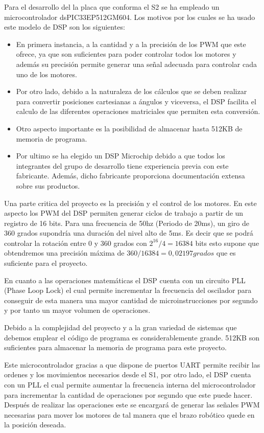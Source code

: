 Para el desarrollo del la placa que conforma el S2 se ha empleado un microcontrolador dsPIC33EP512GM604.
Los motivos por los cuales se ha usado este modelo de DSP son los siguientes: 

\begin{itemize}
\item En primera instancia, a la cantidad y a la precisión de los PWM que este ofrece, ya que son suficientes para poder controlar todos los motores y además su precisión permite generar una señal adecuada para controlar cada uno de los motores.

\item Por otro lado, debido a la naturaleza de los cálculos que se deben realizar para convertir posiciones cartesianas a ángulos y viceversa, el DSP facilita el calculo de las diferentes operaciones matriciales que permiten esta conversión.

\item Otro aspecto importante es la posibilidad de almacenar hasta 512KB de memoria de programa.

\item Por ultimo se ha elegido un DSP Microchip debido a que todos los integrantes del grupo de desarrollo tiene experiencia previa con este fabricante. Además, dicho fabricante proporciona documentación extensa sobre sus productos.

\end{itemize}

Una parte critica del proyecto es la precisión y el control de los motores. En este aspecto los PWM del DSP permiten generar ciclos de trabajo a partir de un registro de 16 bits. Para una frecuencia de 50hz (Periodo de 20ms), un giro de 360 grados supondría una duración del nivel alto de 5ms. Es decir que se podrá controlar la rotación entre 0 y 360 grados con $ 2^{16}/4 = 16384$ bits esto supone que obtendremos una precisión máxima de $360/16384 = 0,02197 grados$ que es suficiente para el proyecto.

En cuanto a las operaciones matemáticas el DSP cuenta con un circuito PLL (Phase Loop Lock) el cual permite incrementar la frecuencia del oscilador para conseguir de esta manera una mayor cantidad de microinstrucciones por segundo y por tanto un mayor volumen de operaciones.

Debido a la complejidad del proyecto y a la gran variedad de sistemas que debemos emplear el código de programa es considerablemente grande. 512KB son suficientes para almacenar la memoria de programa para este proyecto.

Este microcontrolador gracias a que dispone de puertos UART permite recibir las ordenes y los movimientos necesarios desde el S1, por otro lado, el DSP cuenta con un PLL el cual permite aumentar la frecuencia interna del microcontrolador para incrementar la cantidad de operaciones por segundo que este puede hacer. Después de realizar las operaciones este se encargará de generar las señales PWM necesarias para mover los motores de tal manera que el brazo robótico quede en la posición deseada.





    
